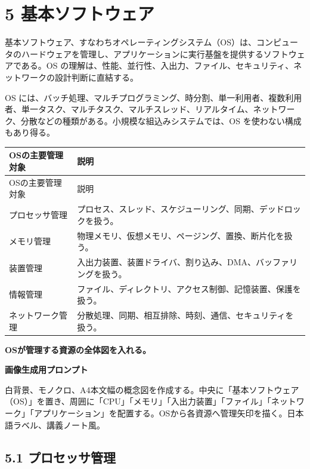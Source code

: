 \documentclass[a4paper,11pt]{ltjsarticle}
\begin{document}
\section{5 基本ソフトウェア}

基本ソフトウェア、すなわちオペレーティングシステム（OS）は、コンピュータのハードウェアを管理し、アプリケーションに実行基盤を提供するソフトウェアである。OS の理解は、性能、並行性、入出力、ファイル、セキュリティ、ネットワークの設計判断に直結する。

OS には、バッチ処理、マルチプログラミング、時分割、単一利用者、複数利用者、単一タスク、マルチタスク、マルチスレッド、リアルタイム、ネットワーク、分散などの種類がある。小規模な組込みシステムでは、OS を使わない構成もあり得る。

\begin{longtable}{>{\raggedright\arraybackslash}p{}>{\raggedright\arraybackslash}p{}}
\toprule
OSの主要管理対象 & 説明 \\
\midrule
\endfirsthead
\toprule
OSの主要管理対象 & 説明 \\
\midrule
\endhead
プロセッサ管理 & プロセス、スレッド、スケジューリング、同期、デッドロックを扱う。 \\
メモリ管理 & 物理メモリ、仮想メモリ、ページング、置換、断片化を扱う。 \\
装置管理 & 入出力装置、装置ドライバ、割り込み、DMA、バッファリングを扱う。 \\
情報管理 & ファイル、ディレクトリ、アクセス制御、記憶装置、保護を扱う。 \\
ネットワーク管理 & 分散処理、同期、相互排除、時刻、通信、セキュリティを扱う。 \\
\bottomrule
\end{longtable}

\begin{todobox}
\textbf{OSが管理する資源の全体図を入れる。}\par
\textbf{画像生成用プロンプト}\par
白背景、モノクロ、A4本文幅の概念図を作成する。中央に「基本ソフトウェア（OS）」を置き、周囲に「CPU」「メモリ」「入出力装置」「ファイル」「ネットワーク」「アプリケーション」を配置する。OSから各資源へ管理矢印を描く。日本語ラベル、講義ノート風。

\end{todobox}

\subsection{5.1 プロセッサ管理}
\end{document}
